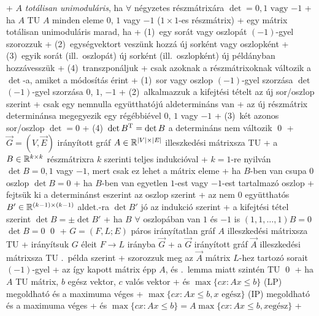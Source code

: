 + \dfn $A$ \emph{totálisan unimoduláris}, ha $\forall$ négyzetes
  részmátrixára $\det = 0, 1 \text{ vagy } {-1}$
  + \corr ha $A$ TU \RA $A$ minden eleme $0$, $1$ vagy $-1$ ($1 \times
    1$-es részmátrix)
+ \lemma \label{lem:linprog:ip:tu}egy mátrix totálisan unimoduláris marad, ha
  + (1)~egy sorát vagy oszlopát $(-1)$-gyel szorozzuk
  + (2)~egységvektort veszünk hozzá új sorként vagy oszlopként
  + (3)~egyik sorát (ill.~oszlopát) új sorként (ill.~oszlopként) új
    példányban hozzávesszük
  + (4)~transzponáljuk
  + \proof csak azoknak a részmátrixoknak változik a $\det$-a,
    amiket a módosítás érint
    + (1)~sor vagy oszlop $(-1)$-gyel szorzása \RA $\det$ $(-1)$-gyel
      szorzása \RA $0$, $1$, $-1$
    + (2)~alkalmazzuk a kifejtési tételt az új sor/oszlop szerint
      + csak egy nemnulla együtthatójú aldetermináns van
      + az új részmátrix determinánsa megegyezik egy régébbiével \RA%
        $0$, $1$ vagy $-1$
    + (3)~két azonos sor/oszlop \RA $\det = 0$
    + (4)~$\det B^{\mathrm{T}} = \det B$ \RA a determináns nem változik \qed
+ \example \label{ex:linprog:ip:directed}$\vec{G} = (V, \vec{E})$ irányított gráf $A \in \mathbb{R}^{\lvert
  V \rvert \times \lvert E \rvert}$ illeszkedési
  mátrixsza TU
  + \proof a $B \in \mathbb{R}^{k \times k}$ részmátrixra $k$ szerinti teljes
    indukcióval
    + $k = 1$-re nyilván $\det B = 0, 1$ vagy $-1$, mert csak ez lehet
      a mátrix eleme
    + ha $B$-ben van csupa $0$ oszlop \RA $\det B = 0$
    + ha $B$-ben van egyetlen $1$-est vagy $-1$-est tartalmazó oszlop
      + fejtsük ki a determinánst eszerint az oszlop szerint
      + az nem $0$ együtthatós $B' \in \mathbb{R}^{(k - 1) \times (k
        - 1)}$ aldet.-ra $\det B'$ jó az indukció  szerint
      + a kifejtési tétel szerint $\det B = \pm \det B'$
    + ha $B$ $\forall$ oszlopában van $1$ és $-1$ is \RA $(1, 1,
      \ldots, 1) B = 0$ \RA $\det B = 0$ \qed
+ \example \label{ex:linprog:ip:bipartite}$G = (F, L; E)$ páros irányítatlan gráf $A$ illeszkedési
  mátrixsza TU
  + \proof irányítsuk $G$ éleit $F \to L$ irányba \RA $\vec{G}$
    + a $\vec{G}$ irányított gráf $\vec{A}$ illeszkedési mátrixsza TU
      .~példa szerint
    + szorozzuk meg az $\vec{A}$ mátrix $L$-hez tartozó sorait $(-1)$-gyel
    + az így kapott mátrix épp $A$, és .~lemma
      miatt szintén TU \qed
+ \thm \label{ex:linprog:ip:iplp}ha $A$ TU mátrix, $b$ egész vektor, $c$ valós vektor
  + és $\max \{ cx : Ax \le b \}$ (LP) megoldható és a maximuma véges
  + \RA $\max \{ cx : Ax \le b, x \text{ egész} \}$ (IP) megoldható és
    a maximuma véges
  + és $\max \{ cx : Ax \le b \} = A \max \{ cx : Ax \le b, x \text{
    egész} \}$
  + \noproof

